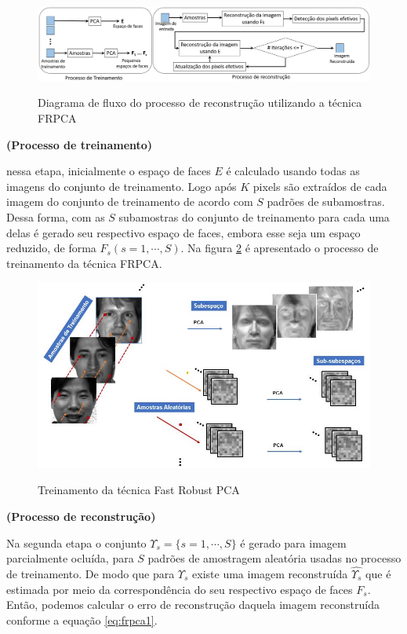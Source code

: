 \begin{figure}[H]
\centering
\caption{Diagrama de fluxo do processo de reconstrução utilizando a técnica FRPCA}
\includegraphics[scale =0.38]{imgs/fluxo_frpca}
\label{fig:fluxo_frpca}
	\end{figure}

\noindent \textbf{(Processo de treinamento)}

nessa etapa, inicialmente o espaço de faces $E$ é calculado usando todas as imagens do conjunto de treinamento. Logo após $K$ pixels são extraídos de cada imagem do conjunto de treinamento de acordo com $S$ padrões de subamostras. Dessa forma, com as $S$ subamostras do conjunto de treinamento para cada uma delas é gerado seu respectivo espaço de faces, embora esse seja um espaço reduzido, de forma $F_s (s=1,\cdots,S)$. Na figura \ref{fig:frpca} é apresentado o processo de treinamento da técnica FRPCA. 

\begin{figure}[H]
\centering
\caption{Treinamento da técnica Fast Robust PCA}
\includegraphics[scale =0.75]{imgs/fastrpca.png}
\label{fig:frpca}
\end{figure}



\noindent \textbf{(Processo de reconstrução)}

Na segunda etapa o conjunto $\Upsilon_s = \{ s=1, \cdots, S\}$ é gerado para imagem parcialmente ocluída, para $S$ padrões de amostragem aleatória usadas no processo de treinamento. De modo que para $\Upsilon_s$ existe uma imagem reconstruída $\hat{\Upsilon_s}$ que é estimada por meio da correspondência do seu respectivo espaço de faces $F_s$. Então, podemos calcular o erro de reconstrução daquela imagem reconstruída conforme a equação \ref{eq:frpca1}.

